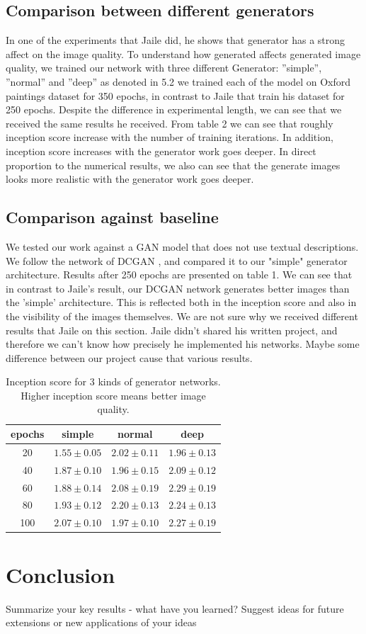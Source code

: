 \documentclass[a4paper]{article}
\begin{document}
\subsection{Comparison between different generators}
In one of the experiments that Jaile did, he shows that generator has a strong affect on the image quality.
To understand how generated affects generated image
quality, we trained our network with three different  Generator:  ”simple”, ”normal” and ”deep” as denoted in 5.2
we trained each of the model on Oxford paintings dataset for 350 epochs, in contrast to Jaile that train his dataset for 250 epochs.
Despite the difference in experimental length, we can see that we received the same results he received.
From table 2 we can see that roughly inception score increase with the number of training iterations. In addition, inception score increases with the generator work goes deeper.
In direct proportion to the numerical results, we also can see that the generate images looks more realistic with the generator work goes deeper.  

\subsection{Comparison against baseline}
We tested our work against a GAN model that does not use textual descriptions. We follow the network of DCGAN \cite{radford2015unsupervised}, and compared it to our "simple" generator architecture. Results after 250 epochs are presented on table 1.
We can see that in contrast to Jaile's result, our DCGAN network generates better images than the 'simple' architecture. This is reflected both in the inception score and also in the visibility of the images themselves.
We are not sure why we received different results that Jaile on this section. Jaile didn't shared his written project, and therefore we can't know how precisely he implemented his networks. Maybe some difference between our project cause that various results.

\begin{table}[ht]
    \centering
    \begin{tabular}{c|c|c|c}
        epochs & simple & normal & deep\\
        \hline
        20 & $1.55 \pm  0.05$ & $\boldsymbol{2.02 \pm  0.11}$ & $1.96 \pm  0.13$ \\
        40 & $1.87 \pm 0.10$ & $1.96 \pm 0.15$ & $\boldsymbol{2.09 \pm 0.12}$ \\
        60 & $1.88 \pm 0.14$ & $2.08 \pm 0.19$ & $\boldsymbol{2.29 \pm 0.19}$ \\
        80 & $1.93 \pm 0.12$ & $2.20 \pm 0.13$ & $\boldsymbol{2.24 \pm 0.13}$ \\
        100 & $2.07 \pm 0.10$ & $1.97 \pm 0.10$ & $\boldsymbol{2.27 \pm 0.19}$
    \end{tabular}
    \caption{Inception score for 3 kinds of generator networks. Higher inception score means better image quality.}
    \label{tab:inception_generators}
\end{table}

\section{Conclusion}
Summarize your key results - what have you learned?
Suggest ideas for future extensions or new applications of your ideas

\printbibliography
\end{document}
